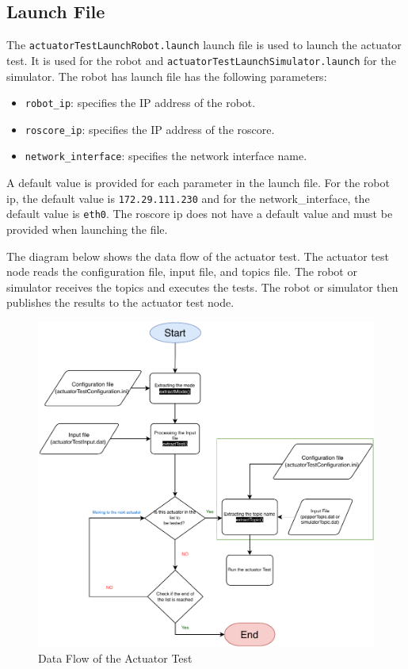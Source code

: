 \documentclass{CSSRforAfrica}
\begin{document}
\subsection*{Launch File}
The \texttt{actuatorTestLaunchRobot.launch} launch file is used to launch the actuator test. It is used for the robot and \texttt{actuatorTestLaunchSimulator.launch} for the simulator.
The robot has launch file has the following parameters:

\begin{itemize}
    \item \texttt{robot\_ip}: specifies the IP address of the robot.
    \item \texttt{roscore\_ip}: specifies the IP address of the roscore.
    \item \texttt{network\_interface}: specifies the network interface name.  
\end{itemize}


A default value is provided for each parameter in the launch file. For the robot ip, the default value 
is \texttt{172.29.111.230} and for the network\_interface, the default value is \texttt{eth0}. The roscore 
ip does not have a default value and must be provided when launching the file.

\newpage

The diagram below shows the data flow of the actuator test. The actuator test node reads the configuration file,
input file, and topics file. The robot or simulator receives the topics and executes the tests. The robot or 
simulator then publishes the results to the actuator test node.

\begin{figure}[!hbpt]
\centering
\includegraphics[scale=0.9]{images/Actuator.pdf}
\caption{Data Flow of the Actuator Test}
\label{fig:actuator_test}
\end{figure}
\end{document}
